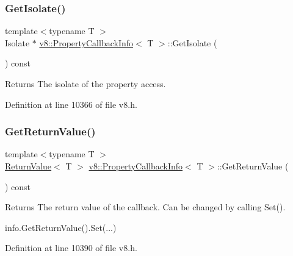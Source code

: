 \subsubsection{\texorpdfstring{Get\+Isolate()}{GetIsolate()}}
{\footnotesize\ttfamily template$<$typename T $>$ \\
Isolate $\ast$ \mbox{\hyperlink{classv8_1_1PropertyCallbackInfo}{v8\+::\+Property\+Callback\+Info}}$<$ T $>$\+::Get\+Isolate (\begin{DoxyParamCaption}{ }\end{DoxyParamCaption}) const}

\begin{DoxyReturn}{Returns}
The isolate of the property access. 
\end{DoxyReturn}


Definition at line 10366 of file v8.\+h.

\mbox{\label{classv8_1_1PropertyCallbackInfo_aa0882946929c3c4df6d131fe0d8d6746}} 
\subsubsection{\texorpdfstring{Get\+Return\+Value()}{GetReturnValue()}}
{\footnotesize\ttfamily template$<$typename T $>$ \\
\mbox{\hyperlink{classv8_1_1ReturnValue}{Return\+Value}}$<$ T $>$ \mbox{\hyperlink{classv8_1_1PropertyCallbackInfo}{v8\+::\+Property\+Callback\+Info}}$<$ T $>$\+::Get\+Return\+Value (\begin{DoxyParamCaption}{ }\end{DoxyParamCaption}) const}

\begin{DoxyReturn}{Returns}
The return value of the callback. Can be changed by calling Set(). 
\begin{DoxyCode}
info.GetReturnValue().Set(...)
\end{DoxyCode}
 
\end{DoxyReturn}


Definition at line 10390 of file v8.\+h.

\mbox{\label{classv8_1_1PropertyCallbackInfo_a66b7ec267f18bd84e8baf0a0e16187b9}} 
